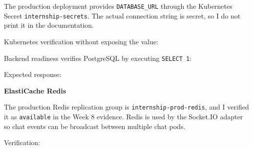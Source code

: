 The production deployment provides \texttt{DATABASE\_\allowbreak{}URL} through the
Kubernetes Secret \texttt{internship-\allowbreak{}secrets}. The actual connection
string is secret, so I do not print it in the documentation.

Kubernetes verification without exposing the value:

\begin{Shaded}
\begin{Highlighting}[]
\end{Highlighting}
\end{Shaded}

Backend readiness verifies PostgreSQL by executing \texttt{SELECT\ 1}:

\begin{Shaded}
\begin{Highlighting}[]
 
\end{Highlighting}
\end{Shaded}

Expected response:

\begin{Shaded}
\begin{Highlighting}[]
\FunctionTok{\{}\FunctionTok{:}\FunctionTok{,}\FunctionTok{:}\FunctionTok{,}\FunctionTok{:\{}\FunctionTok{:}\FunctionTok{\}\}}
\end{Highlighting}
\end{Shaded}

\vspace{0.5em}\noindent\textbf{ElastiCache Redis}\par

The production Redis replication group is
\texttt{internship-\allowbreak{}prod-\allowbreak{}redis}, and I verified it as \texttt{available}
in the Week 8 evidence. Redis is used by the Socket.IO adapter so chat
events can be broadcast between multiple chat pods.

Verification:

